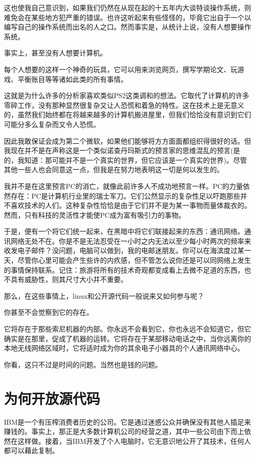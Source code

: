 这也使我自己意识到，如果我们仍然在从现在起的十五年内大谈特谈操作系统，则难免会在某些地方犯严重的错误。也许这听起来有些怪怪的，毕竟它出自于一个以编写自己的操作系统而出名的人之口。然而事实是，从统计上说，没有人想要操作系统。

事实上，甚至没有人想要计算机。

每个人想要的这样一个神奇的玩具，它可以用来浏览网页，撰写学期论文、玩游戏、平衡账目等等诸如此类的所有事情。

这就是为什么许多的分析家喜欢类似PS2这类调和的想法。它取代了计算机的许多零碎工作，没有那种显然很复杂又让人恐慌和着急的特性。这在技术上是无意义的，虽然我们始终都在将越来越多的计算机搬进屋里，但我们恰恰没有意识到它们可能分多么复杂而又令人恐慌。

因此我敢保证会成为第二个微软，如果他们能够将方方面面都组织得很好的话。但我现在并不是在声称这是一个类似诺查丹玛斯式的预言家的思维混乱的预言(是的，我知道：那可能并不是一个真实的世界，但它应该是一个真实的世界)。尽管其他一些人也会同意这一点，但我是在努力地表明这一切是何以发生的。

我并不是在这里预言PC的消亡，就像此前许多人不成功地预言一样。PC的力量依然存在：PC是计算机行业里的瑞士军刀。它们公然显示的复杂性足以吓跑那些并不喜欢技术的人们。这种复杂性恰恰是由于它们并不是为某一事物而量体裁衣的。然而，只有科技的灵活性才能使PC成为富有吸引力的事物。

于是，便有一个将它们统一起来，在黑暗中将它们联接起来的东西：通讯网络。通讯网络无处不在。你是不是无法忍受在一小时之内无法以至少每小时两次的频率来收发电子邮件？没问题，电脑可以做到，我的电邮迷朋友。你可以在海滨度过某一天，尽管你心里可能会产生些许的内疚感，但不管怎么说你还是可以同网络上发生的事情保持联系。记住：旅游将所有的技术奇观都变成看上去微不足道的东西，也不具有威胁性，则其尺寸大小并不重要。

那么，在这些事情上，linux和公开源代码一般说来又如何参与呢？

你甚至不会觉察到它的存在。

它将存在于那些索尼机器的内部。你永远不会看到它，你也永远不会知道它，但它确实是在那里，促成了机器的运转。它将存在于某部移动电话之中，当你远离你的本地无线网络区域时，它将适时成为你的其余电子小器具的个人通讯网络中心。

你看，这只不过是时间的问题。当然也是钱的问题。

 
\section{为何开放源代码}

IBM是一个有压榨消费者历史的公司。它是通过迷惑公众并确保没有其他人插足来赚钱的。事实上，那正是大多数计算机公司的经营之道，其中一些公司由下而上依然在这样做。接着，当IBM开发了个人电脑时，它无意识地公开了其技术，任何人都可以藉此复制。

